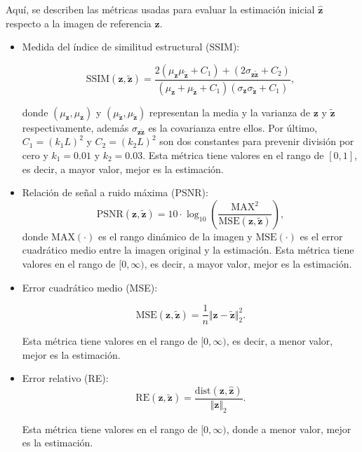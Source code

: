 Aquí, se describen las métricas usadas para evaluar la estimación inicial $\hat{\mathbf{z}}$ respecto a la imagen de referencia $\mathbf{z}$.
\begin{itemize}
    \item Medida del índice de similitud estructural (SSIM):
    
    \begin{equation}
        \mathrm{SSIM}(\mathbf{z}, \tilde{\mathbf{z}}) = \frac{2(\mu_{\mathbf{z}}\mu_{\tilde{\mathbf{z}}} + C_1) + (2\sigma_{\mathbf{z}\tilde{\mathbf{z}}} + C_2)}{(\mu_{\mathbf{z}} + \mu_{\tilde{\mathbf{z}}} + C_1)(\sigma_{\mathbf{z}}\sigma_{\tilde{\mathbf{z}}} + C_1)},
        \label{eq:SSIM}
    \end{equation}
    
    donde $(\mu_{\mathbf{z}}, \mu_{{\mathbf{z}}})$ y $(\mu_{\tilde{\mathbf{z}}}, \mu_{\tilde{\mathbf{z}}})$ representan la media y la varianza de ${\mathbf{z}}$ y $\tilde{\mathbf{z}}$ respectivamente, además $\sigma_{\mathbf{z}\tilde{\mathbf{z}}}$ es la covarianza entre ellos. Por último, $C_1 = (k_1L)^2$ y $C_2 = (k_2L)^2$ son dos constantes para prevenir división por cero y $k_1 = 0.01$ y $k_2 = 0.03$. Esta métrica tiene valores en el rango de $[0, 1]$, es decir, a mayor valor, mejor es la estimación.
    
    \item Relación de señal a ruido máxima (PSNR):
    \begin{equation}
        \mathrm{PSNR}(\mathbf{z}, \tilde{\mathbf{z}})=10 \cdot \log_{10}\left(\frac{\mathrm{MAX}^{2}}{\mathrm{MSE}(\mathbf{z}, \tilde{\mathbf{z}})}\right),
        \label{eq:PSNR}
    \end{equation}
    donde $\mathrm{MAX}(\cdot)$ es el rango dinámico de la imagen y $\mathrm{MSE}(\cdot)$ es el error cuadrático medio entre la imagen original y la estimación. Esta métrica tiene valores en el rango de $[0, \infty)$, es decir, a mayor valor, mejor es la estimación.
    
    \item Error cuadrático medio (MSE):
    
    \begin{equation}
        \mathrm{MSE}(\mathbf{z}, \tilde{\mathbf{z}}) = \frac{1}{n} \Vert \mathbf{z} - \tilde{\mathbf{z}}\Vert_2^2.
        \label{eq:MSE}
    \end{equation}
    
    Esta métrica tiene valores en el rango de $[0, \infty)$, es decir, a menor valor, mejor es la estimación.

    \item Error relativo (RE): 
    \begin{equation}
        \mathrm{RE}(\mathbf{z}, \tilde{\mathbf{z}}) = \frac{ \mathrm{dist}(\mathbf{z}, \hat{\mathbf{z}})}{\Vert \mathbf{z} \Vert_2}.
        \label{eq:RE}
    \end{equation}
    
    Esta métrica tiene valores en el rango de $[0, \infty)$, donde a menor valor, mejor es la estimación.
\end{itemize}
